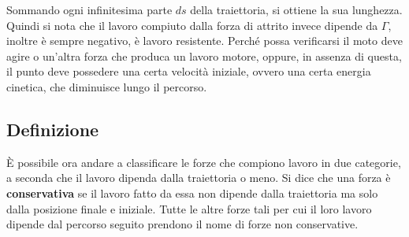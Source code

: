 \documentclass[10pt,a4paper]{book}
\begin{document}
\begin{figure}[htpb]
\end{figure}
\FloatBarrier
Sommando ogni infinitesima parte $ds$ della traiettoria, si ottiene la sua lunghezza. Quindi si nota che il lavoro compiuto dalla forza di attrito invece dipende da $\Gamma$, inoltre è sempre negativo, è lavoro resistente. Perché possa verificarsi il moto deve agire o un'altra forza che produca un lavoro motore, oppure, in assenza di questa, il punto deve possedere una certa velocità iniziale, ovvero una certa energia cinetica, che diminuisce lungo il percorso.

\subsection{Definizione}

È possibile ora andare a classificare le forze che compiono lavoro in due categorie, a seconda che il lavoro dipenda dalla traiettoria o meno.
Si dice che una forza è \textbf{conservativa} se il lavoro fatto da essa non dipende dalla traiettoria ma solo dalla posizione finale e iniziale. Tutte le altre forze tali per cui il loro lavoro dipende dal percorso seguito prendono il nome di forze non conservative.
\end{document}
